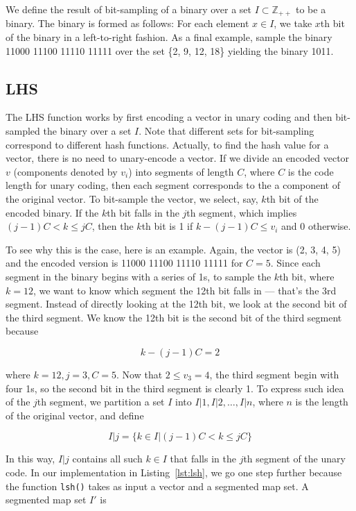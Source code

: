 \documentclass{ee208report}
\begin{document}
\begin{multicols*}{2}
We define the result of bit-sampling of a binary over a set $I \subset
\mathbb{Z_{++}}$ to be a binary. The binary is formed as follows: For each
element $x \in I$, we take $x$th bit of the binary in a left-to-right fashion.
As a final example, sample the binary 11000 11100 11110 11111 over the set \{2,
9, 12, 18\} yielding the binary 1011.

\subsection{LHS}

The LHS function works by first encoding a vector in unary coding and then
bit-sampled the binary over a set $I$. Note that different sets for bit-sampling
correspond to different hash functions. Actually, to find the hash value for a
vector, there is no need to unary-encode a vector. If we divide an encoded
vector $v$ (components denoted by $v_i$) into segments of length $C$, where $C$
is the code length for unary coding, then each segment corresponds to the a
component of the original vector. To bit-sample the vector, we select, say,
$k$th bit of the encoded binary. If the $k$th bit falls in the $j$th segment,
which implies $(j - 1)C < k \leq jC$, then the $k$th bit is 1 if $k - (j - 1)C
\leq v_i$ and 0 otherwise.

To see why this is the case, here is an example. Again, the vector is (2, 3, 4,
5) and the encoded version is 11000 11100 11110 11111 for $C = 5$. Since each
segment in the binary begins with a series of 1s, to sample the $k$th bit, where
$k = 12$, we want to know which segment the 12th bit falls in --- that's the 3rd
segment. Instead of directly looking at the 12th bit, we look at the second bit
of the third segment. We know the 12th bit is the second bit of the third
segment because

\[
    k - (j - 1)C = 2
\]

where $k = 12, j = 3, C = 5$. Now that $2 \leq v_3 = 4$, the third segment begin
with four 1s, so the second bit in the third segment is clearly 1. To express
such idea of the $j$th segment, we partition a set $I$ into $I|1, I|2,\dots,
I|n$, where $n$ is the length of the original vector, and define

\[
    I|j = \{k \in I|(j - 1)C < k \leq jC\}
\]

In this way, $I|j$ contains all such $k \in I$ that falls in the $j$th segment
of the unary code. In our implementation in Listing~\ref{lst:lsh}, we go one
step further because the function \texttt{lsh()} takes as input a vector and a
segmented map set. A segmented map set $I'$ is


\end{multicols*}
\end{document}
